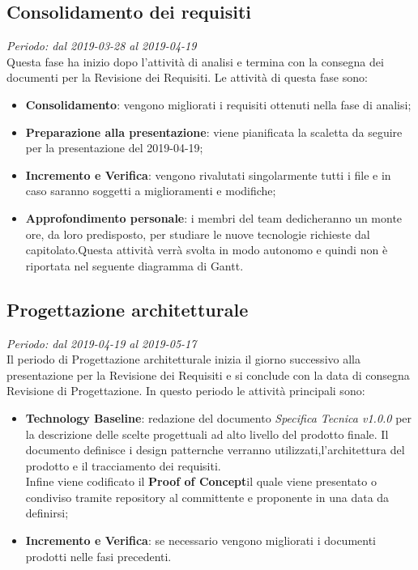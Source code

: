 \subsection{Consolidamento dei requisiti}
\textit{Periodo: dal 2019-03-28 al 2019-04-19} \\
Questa fase ha inizio dopo l'attività di analisi e termina con la consegna dei documenti per la Revisione dei Requisiti. Le attività 
di questa fase sono:
\begin{itemize}
	\item \textbf{Consolidamento}: vengono migliorati i requisiti ottenuti nella fase di analisi;
	\item \textbf{Preparazione alla presentazione}: viene pianificata la scaletta da seguire per la presentazione del 2019-04-19;
	\item \textbf{Incremento e Verifica}: vengono rivalutati singolarmente tutti i file e in caso saranno soggetti a miglioramenti e modifiche;
	\item \textbf{Approfondimento personale}: i membri del team dedicheranno un monte ore, da loro predisposto, per studiare le nuove tecnologie richieste dal capitolato\glo.Questa attività verrà svolta in modo autonomo e quindi non è riportata nel seguente diagramma di Gantt.%
\end{itemize}
%

\subsection{Progettazione architetturale}
\textit{Periodo: dal 2019-04-19 al 2019-05-17} \\
Il periodo di Progettazione architetturale inizia il giorno successivo alla presentazione per la Revisione dei Requisiti e si conclude con la data di consegna Revisione di 
Progettazione. In questo periodo le attività principali sono:
\begin{itemize}
	\item \textbf{Technology Baseline}: redazione del documento \textit{Specifica Tecnica v1.0.0} per la descrizione delle scelte progettuali ad alto livello del prodotto finale.
	Il documento definisce i design pattern\glosp che verranno utilizzati,l'architettura del prodotto e il tracciamento dei requisiti.\\
	Infine viene codificato il \textbf{Proof of Concept}\glosp il 
	quale viene presentato o condiviso tramite repository al committente e 
	proponente in una data da definirsi;
	\item \textbf{Incremento e Verifica}: se necessario vengono migliorati i 
	documenti prodotti nelle fasi precedenti.
\end{itemize}

